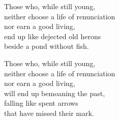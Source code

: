 Those who, while still young,\\
neither choose a life of renunciation\\
nor earn a good living,\\
end up like dejected old herons\\
beside a pond without fish.


Those who, while still young,\\
neither choose a life of renunciation\\
nor earn a good living,\\
will end up bemoaning the past,\\
falling like spent arrows\\
that have missed their mark.

